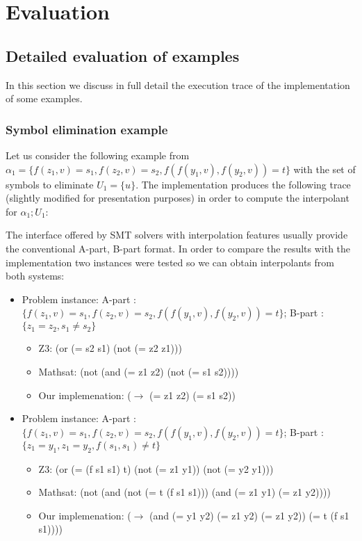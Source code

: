 \section{Evaluation}

\subsection{Detailed evaluation of examples}

In this section we discuss in full detail the execution trace
of the implementation of some examples. 

\subsubsection{Symbol elimination example}

Let us consider the following example from \cite{KAPUR2017} 
$\alpha_1 = \{f(z_1, v) = s_1, f(z_2, v) = s_2, f(f(y_1, v), f(y_2, v)) = t\}$
with the set of symbols to eliminate $U_1 = \{u\}$. The implementation produces the following
trace (slightly modified for presentation purposes) in order to compute 
the interpolant for $\alpha_1; U_1$:



The interface offered by SMT solvers with interpolation features usually provide the 
conventional A-part, B-part format. In order to compare the results with the implementation two 
instances were tested so we can obtain interpolants from both systems:

\begin{itemize}
\item Problem instance: A-part : $\{f(z_1, v) = s_1, f(z_2, v) = s_2, f(f(y_1, v), f(y_2, v)) = t\}$; B-part : $\{z_1 = z_2, s_1 \neq s_2 \}$
\begin{itemize}
\item Z3: (or (= s2 s1) (not (= z2 z1)))
\item Mathsat: (not (and (= z1 z2) (not (= s1 s2))))
\item Our implemenation: ($\rightarrow$ (= z1 z2) (= s1 s2))
\end{itemize}

\item Problem instance: A-part : $\{f(z_1, v) = s_1, f(z_2, v) = s_2, f(f(y_1, v), f(y_2, v)) = t\}$; B-part : $\{z_1 = y_1, z_1 = y_2, f(s_1, s_1) \neq t\}$
\begin{itemize}
\item Z3: (or (= (f s1 s1) t) (not (= z1 y1)) (not (= y2 y1)))
\item Mathsat: (not (and (not (= t (f s1 s1))) (and (= z1 y1) (= z1 y2))))
\item Our implemenation: ($\rightarrow$ (and (= y1 y2) (= z1 y2) (= z1 y2)) (= t (f s1 s1))))
\end{itemize}

\end{itemize}

